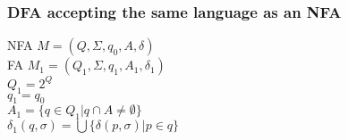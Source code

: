 \begin{frame}
    \frametitle{DFA accepting the same language as an NFA}
    NFA $M = (Q, \Sigma, q_0, A, \delta)$\\
    FA $M_1 = (Q_1, \Sigma, q_1, A_1, \delta_1)$\\
    \pause
    $Q_1 = 2^Q$\\
    $q_1 = q_0$\\
    \pause
    $A_1 = \{q \in Q_1 | q \cap A \neq \emptyset \}$\\
    \pause
    $\delta_1(q,\sigma) = \bigcup\{ \delta(p,\sigma) | p \in q \}$\\
\end{frame}


